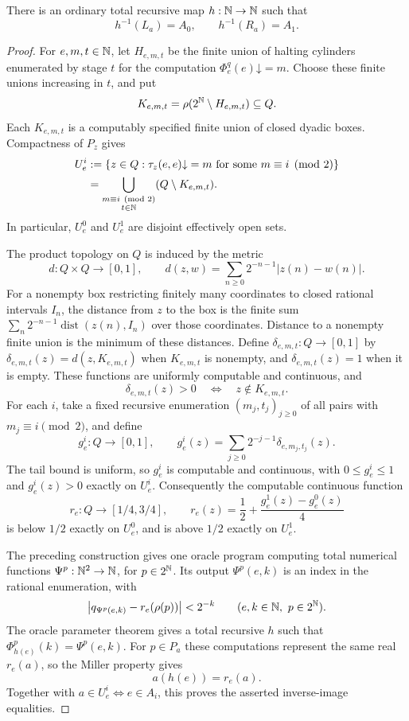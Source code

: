 \begin{lemma}\label{lem:miller-cut-reduction}
There is an ordinary total recursive map $h:\mathbb N\to\mathbb N$ such that
\[
 h^{-1}(L_a)=A_0,\qquad h^{-1}(R_a)=A_1.
\]
\end{lemma}
\begin{proof}
For $e,m,t\in\mathbb N$, let $H_{e,m,t}$ be the finite union of halting
cylinders enumerated by stage $t$ for the computation
$\Phi_e^q(e)\mathord\downarrow=m$. Choose these finite unions increasing
in $t$, and put
\[
 K_{e,m,t}=\rho(2^{\mathbb N}\setminus H_{e,m,t})\subseteq Q.
\]
Each $K_{e,m,t}$ is a computably specified finite union of closed dyadic
boxes. Compactness of $P_z$ gives
\begin{align*}
 U_e^i
 &:=\{z\in Q:\tau_z(e,e)\mathord\downarrow=m
                      \text{ for some }m\equiv i\pmod2\}\\
 &=\bigcup_{\substack{m\equiv i\pmod2\\t\in\mathbb N}}
       (Q\setminus K_{e,m,t}).
\end{align*}
In particular, $U_e^0$ and $U_e^1$ are disjoint effectively open sets.

The product topology on $Q$ is induced by the metric
\[
 d:Q\times Q\to[0,1],\qquad
 d(z,w)=\sum_{n\geq0}2^{-n-1}|z(n)-w(n)|.
\]
For a nonempty box restricting finitely many coordinates to closed
rational intervals $I_n$, the distance from $z$ to the box is the
finite sum
$\sum_n2^{-n-1}\operatorname{dist}(z(n),I_n)$ over those coordinates.
Distance to a nonempty finite union is the minimum of these distances.
Define $\delta_{e,m,t}:Q\to[0,1]$ by
$\delta_{e,m,t}(z)=d(z,K_{e,m,t})$ when $K_{e,m,t}$ is nonempty, and
$\delta_{e,m,t}(z)=1$ when it is empty. These functions are uniformly
computable and continuous, and
\[
 \delta_{e,m,t}(z)>0\quad\Longleftrightarrow\quad
 z\notin K_{e,m,t}.
\]
For each $i$, take a fixed recursive enumeration
$(m_j,t_j)_{j\geq0}$ of all pairs with $m_j\equiv i\pmod2$, and define
\[
 g_e^i:Q\to[0,1],\qquad
 g_e^i(z)=\sum_{j\geq0}2^{-j-1}\delta_{e,m_j,t_j}(z).
\]
The tail bound is uniform, so $g_e^i$ is computable and continuous,
with $0\leq g_e^i\leq1$ and $g_e^i(z)>0$ exactly on $U_e^i$.
Consequently the computable continuous function
\[
 r_e:Q\to[1/4,3/4],\qquad
 r_e(z)=\frac12+\frac{g_e^1(z)-g_e^0(z)}4
\]
is below $1/2$ exactly on $U_e^0$, and
is above $1/2$ exactly on $U_e^1$.

The preceding construction gives one oracle program computing total
numerical functions $\Psi^p:\mathbb N^2\to\mathbb N$, for $p\in2^{\mathbb N}$.
Its output $\Psi^p(e,k)$ is an index in the rational enumeration,
with
\[
 \bigl|q_{\Psi^p(e,k)}-r_e(\rho(p))\bigr|<2^{-k}
 \qquad(e,k\in\mathbb N,\ p\in2^{\mathbb N}).
\]
The oracle parameter theorem gives a total recursive $h$ such that
$\Phi_{h(e)}^p(k)=\Psi^p(e,k)$. For $p\in P_a$ these computations
represent the same real $r_e(a)$, so the Miller property gives
\[
 a(h(e))=r_e(a).
\]
Together with $a\in U_e^i\Longleftrightarrow e\in A_i$, this proves
the asserted inverse-image equalities.
\end{proof}

